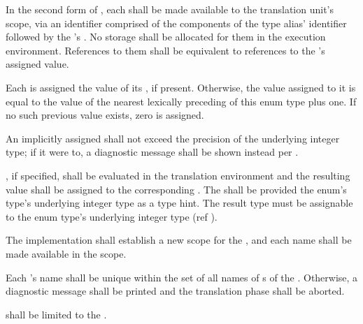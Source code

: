 \specsubsubitem
In the second form of , each 
shall be made available to the translation unit's scope, via an identifier
comprised of the components of the type alias' identifier followed by the
's . No storage shall be allocated for
them in the execution environment. References to them shall be equivalent to
references to the 's assigned value.

\specsubsubitem
Each  is assigned the value of its
, if present. Otherwise, the value assigned to it is
equal to the value of the nearest lexically preceding 
of this enum type plus one. If no such previous value exists, zero is assigned.

\specsubsubitem
An implicitly assigned  shall not exceed the precision
of the underlying integer type; if it were to, a diagnostic message shall be
shown instead per .

\specsubsubitem
{}, if specified, shall be evaluated in the translation
environment and the resulting value shall be assigned to the corresponding
. The  shall be provided the
enum's type's underlying integer type as a type hint. The result type must be
assignable to the enum type's underlying integer type (ref
).

\specsubsubitem
The implementation shall establish a new scope for the
, and each  name shall be made
available in the scope.


\specsubsubitem
Each 's name shall be unique within the set of all
names of s of the . Otherwise, a
diagnostic message shall be printed and the translation phase shall be aborted.

\specsubsubitem
{} shall be limited to the
.


